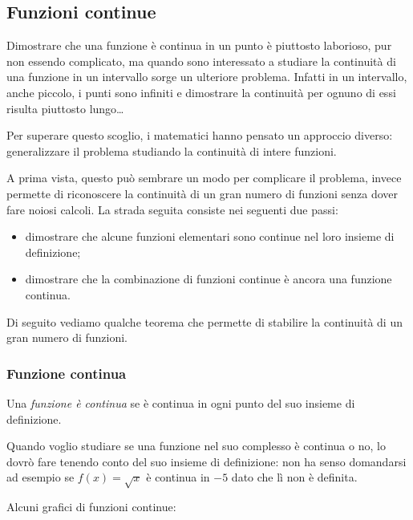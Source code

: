 \subsection{Funzioni continue}
\label{subsec:cont_definizione}

Dimostrare che una funzione è continua in un punto è piuttosto laborioso, 
pur non essendo complicato, ma quando sono interessato a studiare la 
continuità di una funzione in un intervallo sorge un ulteriore problema. 
Infatti in un intervallo, anche piccolo, i punti sono infiniti e dimostrare 
la continuità per ognuno di essi risulta piuttosto lungo\dots

Per superare questo scoglio, i matematici hanno pensato un approccio 
diverso:
generalizzare il problema studiando la continuità di intere funzioni.

A prima vista, questo può sembrare un modo per complicare il problema, 
invece permette di riconoscere la continuità di un gran numero di 
funzioni senza dover fare noiosi calcoli. La strada seguita consiste nei 
seguenti due passi:
\begin{itemize} [noitemsep]
\item dimostrare che alcune funzioni elementari sono continue nel loro 
insieme di definizione;
\item dimostrare che la combinazione di funzioni continue è ancora una 
funzione continua.
\end{itemize}
Di seguito vediamo qualche teorema che permette di stabilire la continuità di 
un gran numero di funzioni.

\subsubsection{Funzione continua}
\label{subsubsec:cont_funzionecontinua}

\begin{definizione}
Una \emph{funzione è continua} se è continua in ogni punto del suo 
insieme di definizione.
\end{definizione}

Quando voglio studiare se una funzione nel suo complesso è continua o no, lo 
dovrò fare tenendo conto del suo insieme di definizione: non ha senso 
domandarsi ad esempio se \(f(x) = \sqrt{x}\) è continua in \(-5\) dato che lì 
non è definita.

Alcuni grafici di funzioni continue:

\hspace{-12mm}\begin{minipage}{.32\textwidth}
\begin{center} \scalebox{.9}{\contsecondoa} \end{center}
\end{minipage}
\hfill
\begin{minipage}{.32\textwidth}
\begin{center} \contrad \end{center}
\end{minipage}
\hfill
\begin{minipage}{.32\textwidth}
\begin{center} \contip \end{center}
\end{minipage}


